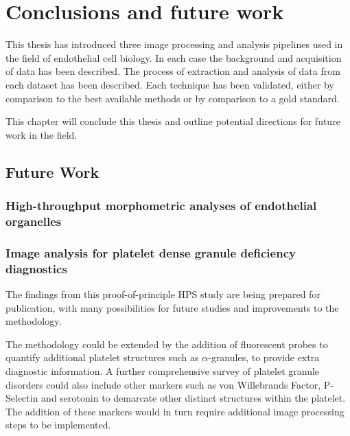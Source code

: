 \chapter{Conclusions and future work}
\label{conclusions_and_future_work}
\ifpdf
    \graphicspath{{chapter_5/figs/}}
\fi

This thesis has introduced three image processing and analysis pipelines used in the field of endothelial cell biology. In each case the background and acquisition of data has been described. The process of extraction and analysis of data from each dataset has been described. Each technique has been validated, either by comparison to the best available methods or by comparison to a gold standard.

This chapter will conclude this thesis and outline potential directions for future work in the field.

\section{Future Work}
\subsection{High-throughput morphometric analyses of endothelial organelles}
\subsection{Image analysis for platelet dense granule deficiency diagnostics}
The findings from this proof-of-principle HPS study are being prepared for publication, with many possibilities for future studies and improvements to the methodology.

The methodology could be extended by the addition of fluorescent probes to quantify additional platelet structures such as $\alpha$-granules, to provide extra diagnostic information. A further comprehensive survey of platelet granule disorders could also include other markers such as von Willebrands Factor, P-Selectin and serotonin to demarcate other distinct structures within the platelet. The addition of these markers would in turn require additional image processing steps to be implemented. 

